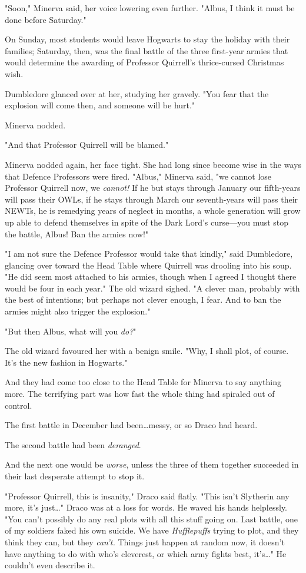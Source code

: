 "Soon," Minerva said, her voice lowering even further. "Albus, I think it must
be done before Saturday."

On Sunday, most students would leave Hogwarts to stay the holiday with their
families; Saturday, then, was the final battle of the three first-year armies
that would determine the awarding of Professor Quirrell's thrice-cursed
Christmas wish.

Dumbledore glanced over at her, studying her gravely. "You fear that the
explosion will come then, and someone will be hurt."

Minerva nodded.

"And that Professor Quirrell will be blamed."

Minerva nodded again, her face tight. She had long since become wise in the
ways that Defence Professors were fired. "Albus," Minerva said, "we cannot lose
Professor Quirrell now, we \emph{cannot!} If he but stays through January our
fifth-years will pass their OWLs, if he stays through March our seventh-years
will pass their NEWTs, he is remedying years of neglect in months, a whole
generation will grow up able to defend themselves in spite of the Dark Lord's
curse---you must stop the battle, Albus! Ban the armies now!"

"I am not sure the Defence Professor would take that kindly," said Dumbledore,
glancing over toward the Head Table where Quirrell was drooling into his soup.
"He did seem most attached to his armies, though when I agreed I thought there
would be four in each year." The old wizard sighed. "A clever man, probably
with the best of intentions; but perhaps not clever enough, I fear. And to ban
the armies might also trigger the explosion."

"But then Albus, what will you \emph{do?}"

The old wizard favoured her with a benign smile. "Why, I shall plot, of course.
It's the new fashion in Hogwarts."

And they had come too close to the Head Table for Minerva to say anything more.
\later
The terrifying part was how fast the whole thing had spiraled out of control.

The first battle in December had been…messy, or so Draco had heard.

The second battle had been \emph{deranged}.

And the next one would be \emph{worse}, unless the three of them together
succeeded in their last desperate attempt to stop it.

"Professor Quirrell, this is insanity," Draco said flatly. "This isn't
Slytherin any more, it's just…" Draco was at a loss for words. He
waved his hands helplessly. "You can't possibly do any real plots with all this
stuff going on. Last battle, one of my soldiers faked his own suicide. We have
\emph{Hufflepuffs} trying to plot, and they think they can, but they
\emph{can't.} Things just happen at random now, it doesn't have anything to do
with who's cleverest, or which army fights best, it's…" He couldn't even
describe it.

